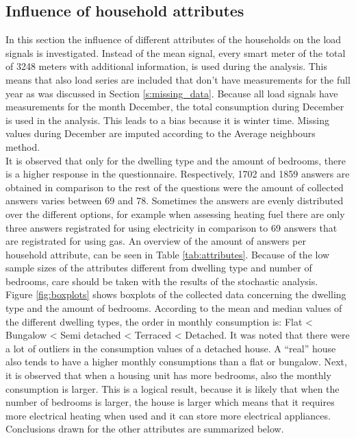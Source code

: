 \subsection{Influence of household attributes} \label{s:Identification of driving attributes}
In this section the influence of different attributes of the households on the load signals is investigated. Instead of the mean signal, every smart meter of the total of 3248 meters with additional information, is used during the analysis. This means that also load series are included that don't have measurements for the full year as was discussed in Section \ref{s:missing_data}. Because all load signals have measurements for the month December, the total consumption during December is used in the analysis. This leads to a bias because it is winter time. Missing values during December are imputed according to the Average neighbours method.\\
It is observed that only for the dwelling type and the amount of bedrooms, there is a higher response in the questionnaire. Respectively, 1702 and 1859 answers are obtained in comparison to the rest of the questions were the amount of collected answers varies between 69 and 78. Sometimes the answers are evenly distributed over the different options, for example when assessing heating fuel there are only three answers registrated for using electricity in comparison to 69 answers that are registrated for using gas. An overview of the amount of answers per household attribute, can be seen in Table \ref{tab:attributes}. Because of the low sample sizes of the attributes different from dwelling type and number of bedrooms, care should be taken with the results of the stochastic analysis.\\
Figure \ref{fig:boxplots} shows boxplots of the collected data concerning the dwelling type and the amount of bedrooms. According to the mean and median values of the different dwelling types, the order in monthly consumption is: Flat < Bungalow < Semi detached < Terraced < Detached. It was noted that there were a lot of outliers in the consumption values of a detached house. A ``real'' house also tends to have a higher monthly consumptions than a flat or bungalow. Next, it is observed that when a housing unit has more bedrooms, also the monthly consumption is larger. This is a logical result, because it is likely that when the number of bedrooms is larger, the house is larger which means that it requires more electrical heating when used and it can store more electrical appliances. Conclusions drawn for the other attributes are summarized below.

